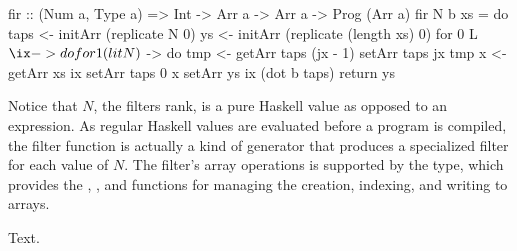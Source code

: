 \documentclass[../main.tex]{subfiles}
\begin{document}
\begin{code}
fir :: (Num a, Type a) => Int -> Arr a -> Arr a -> Prog (Arr a)
fir N b xs = do
  taps <- initArr (replicate N 0)
  ys   <- initArr (replicate (length xs) 0)
  for 0 L $ \ix -> do
    for 1 (lit N) $ \jx -> do
      tmp <- getArr taps (jx - 1)
      setArr taps jx tmp
    x <- getArr xs ix
    setArr taps 0 x
    setArr ys ix (dot b taps)
  return ys
\end{code}

\noindent Notice that $N$, the filters rank, is a pure Haskell value as opposed to an expression. As regular Haskell values are evaluated before a program is compiled, the filter function is actually a kind of generator that produces a specialized filter for each value of $N$. The filter's array operations is supported by the  type, which provides the , , and  functions for managing the creation, indexing, and writing to arrays.

Text.








\end{document}
